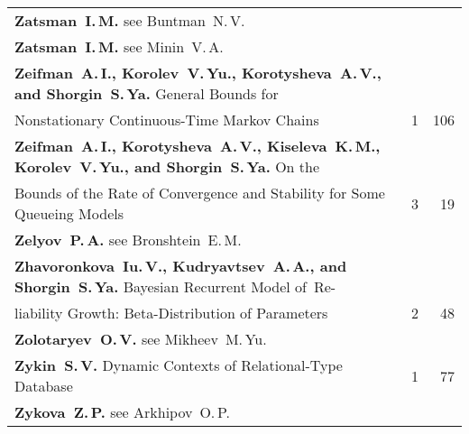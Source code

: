 {\begin{tabular}{p{397pt}rr}
\textbf{Zatsman~I.\,M.} see Buntman~N.\,V.&&\\
\textbf{Zatsman~I.\,M.} see Minin~V.\,A.&&\\
\textbf{Zeifman~A.\,I., Korolev~V.\,Yu., Korotysheva~A.\,V., and Shorgin~S.\,Ya.} General
Bounds for\linebreak
\vspace*{-12pt}\\
\hspace*{23pt}Nonstationary Continuous-Time Markov Chains\dotfill&1&106\\
\textbf{Zeifman~A.\,I., Korotysheva~A.\,V., Kiseleva~K.\,M., Korolev~V.\,Yu., and
Shorgin~S.\,Ya.} On the\linebreak
\vspace*{-12pt}\\
\hspace*{23pt}Bounds of the Rate of Convergence and Stability for Some Queueing
Models\dotfill&3&19\\
\textbf{Zelyov~P.\,A.} see Bronshtein~E.\,M.&&\\
\textbf{Zhavoronkova~Iu.\,V., Kudryavtsev~A.\,A., and Shorgin~S.\,Ya.} Bayesian Recurrent
Model of~Re-\linebreak
\vspace*{-12pt}\\
\hspace*{23pt}lia\-bili\-ty Growth: Beta-Distribution of Parameters\dotfill&2&48\\
\textbf{Zolotaryev~O.\,V.} see Mikheev~M.\,Yu.&&\\
\textbf{Zykin~S.\,V.} Dynamic Contexts of Relational-Type Database\dotfill&1&77\\
\textbf{Zykova~Z.\,P.} see Arkhipov~O.\,P.&&\\
\end{tabular}
}

\def\leftfootline{\small{\textbf{\thepage}
\hfill INFORMATIKA I EE PRIMENENIYA~--- INFORMATICS AND APPLICATIONS\ \ \ 2014\
\ \ volume~8\ \ \ issue\ 4}
}%
 \def\rightfootline{\small{INFORMATIKA I EE PRIMENENIYA~---
INFORMATICS AND APPLICATIONS\ \ \ 2014\ \ \ volume~8\ \ \ issue\ 4
\hfill \textbf{\thepage}}}

 \label{end\stat}

\newpage